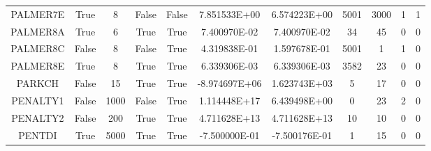 \begin{longtable}{ccccccccccc}
	\cellcolor{default2} PALMER7E& \cellcolor{default2} True& \cellcolor{default2} 8& \cellcolor{default2} False& \cellcolor{default2} False& \cellcolor{poor} 7.851533E+00& \cellcolor{best} 6.574223E+00& \cellcolor{ok} 5001& \cellcolor{best} 3000& \cellcolor{default2} 1& \cellcolor{default2} 1\\
	\cellcolor{default1} PALMER8A& \cellcolor{default1} True& \cellcolor{default1} 6& \cellcolor{default1} True& \cellcolor{default1} True& \cellcolor{best} 7.400970E-02& \cellcolor{ok} 7.400970E-02& \cellcolor{best} 34& \cellcolor{ok} 45& \cellcolor{default1} 0& \cellcolor{default1} 0\\
	\cellcolor{default2} PALMER8C& \cellcolor{default2} False& \cellcolor{default2} 8& \cellcolor{default2} False& \cellcolor{default2} True& \cellcolor{poor} 4.319838E-01& \cellcolor{best} 1.597678E-01& \cellcolor{poor} 5001& \cellcolor{best} 1& \cellcolor{default2} 1& \cellcolor{default2} 0\\
	\cellcolor{default1} PALMER8E& \cellcolor{default1} True& \cellcolor{default1} 8& \cellcolor{default1} True& \cellcolor{default1} True& \cellcolor{ok} 6.339306E-03& \cellcolor{best} 6.339306E-03& \cellcolor{poor} 3582& \cellcolor{best} 23& \cellcolor{default1} 0& \cellcolor{default1} 0\\
	\cellcolor{default2} PARKCH& \cellcolor{default2} False& \cellcolor{default2} 15& \cellcolor{default2} True& \cellcolor{default2} True& \cellcolor{best} -8.974697E+06& \cellcolor{poor} 1.623743E+03& \cellcolor{best} 5& \cellcolor{poor} 17& \cellcolor{default2} 0& \cellcolor{default2} 0\\
	\cellcolor{default1} PENALTY1& \cellcolor{default1} False& \cellcolor{default1} 1000& \cellcolor{default1} False& \cellcolor{default1} True& \cellcolor{poor} 1.114448E+17& \cellcolor{best} 6.439498E+00& \cellcolor{best} 0& \cellcolor{poor} 23& \cellcolor{default1} 2& \cellcolor{default1} 0\\
	\cellcolor{default2} PENALTY2& \cellcolor{default2} False& \cellcolor{default2} 200& \cellcolor{default2} True& \cellcolor{default2} True& \cellcolor{best} 4.711628E+13& \cellcolor{ok} 4.711628E+13& \cellcolor{best} 10& \cellcolor{best} 10& \cellcolor{default2} 0& \cellcolor{default2} 0\\
	\cellcolor{default1} PENTDI& \cellcolor{default1} True& \cellcolor{default1} 5000& \cellcolor{default1} True& \cellcolor{default1} True& \cellcolor{ok} -7.500000E-01& \cellcolor{best} -7.500176E-01& \cellcolor{best} 1& \cellcolor{poor} 15& \cellcolor{default1} 0& \cellcolor{default1} 0\\

\end{longtable}
